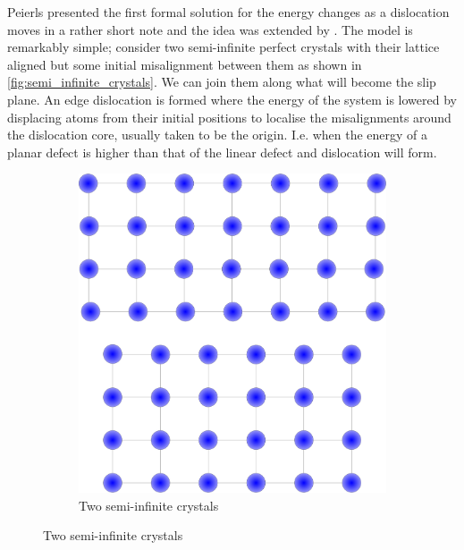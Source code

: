 Peierls presented the first formal solution for the energy changes as a dislocation moves in a rather short note \cite{Peierls1940} and the idea was extended by \citet{Nabarro1947}. The model is remarkably simple; consider two semi-infinite perfect crystals with their lattice aligned but some initial misalignment between them as shown in \autoref{fig:semi_infinite_crystals}. We can join them along what will become the slip plane. An edge dislocation is formed where the energy of the system is lowered by displacing atoms from their initial positions to localise the misalignments around the dislocation core, usually taken to be the origin. I.e. when the energy of a planar defect is higher than that of the linear defect and dislocation will form.



\begin{figure}
\centering

    \begin{subfigure}{0.4\textwidth}
        \includegraphics[width=\textwidth]{Half_crystals}
        \caption{Two semi-infinite crystals \label{fig:semi_infinite_crystals}}
    \end{subfigure}


\end{figure}
